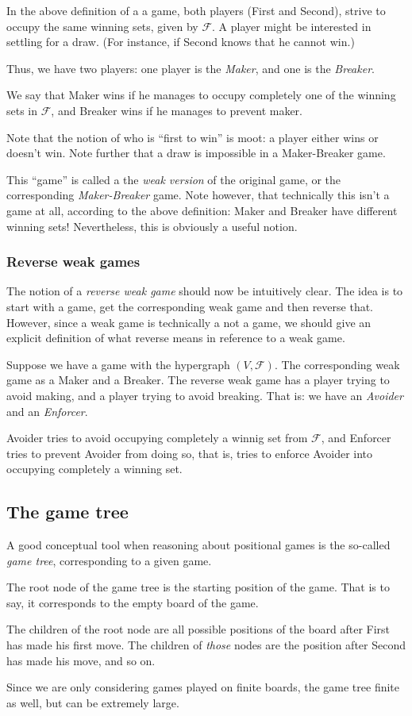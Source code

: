 In the above definition of a a game, both players (First and Second), strive to occupy the same winning sets, given by $\mathcal F$. A player might be interested in settling for a draw. (For instance, if Second knows that he cannot win.) 

Thus, we have two players: one player is the \emph{Maker}, and one is the \emph{Breaker}.

We say that Maker wins if he manages to occupy completely one of the winning sets in $\mathcal F$, and Breaker wins if he manages to prevent maker.

Note that the notion of who is ``first to win'' is moot: a player either wins or doesn't win.
Note further that a draw is impossible in a Maker-Breaker game.

This ``game'' is called a the \emph{weak version} of the original game, or the corresponding \emph{Maker-Breaker} game.
Note however, that technically this isn't a game at all, according to the above definition: Maker and Breaker have different winning sets! Nevertheless, this is obviously a useful notion.

\subsubsection{Reverse weak games}

The notion of a \emph{reverse weak game} should now be intuitively clear.
The idea is to start with a game, get the corresponding weak game and then reverse that.
However, since a weak game is technically a not a game, we should give an explicit definition of what reverse means in reference to a weak game.

Suppose we have a game with the hypergraph $(V,\mathcal F)$.
The corresponding weak game as a Maker and a Breaker.
The reverse weak game has a player trying to avoid making, and a player trying to avoid breaking.
That is: we have an \emph{Avoider} and an \emph{Enforcer}.

Avoider tries to avoid occupying completely a winnig set from $\mathcal F$, and Enforcer tries to prevent Avoider from doing so, that is, tries to enforce Avoider into occupying completely a winning set.


\subsection{The game tree}
\label{subsec:gametree}
A good conceptual tool when reasoning about positional games is the so-called \emph{game tree}, corresponding to a given game.

The root node of the game tree is the starting position of the game.
That is to say, it corresponds to the empty board of the game.

The children of the root node are all possible positions of the board after First has made his first move.
The children of \emph{those} nodes are the position after Second has made his move, and so on.

Since we are only considering games played on finite boards, the game tree finite as well, but can be extremely large.

